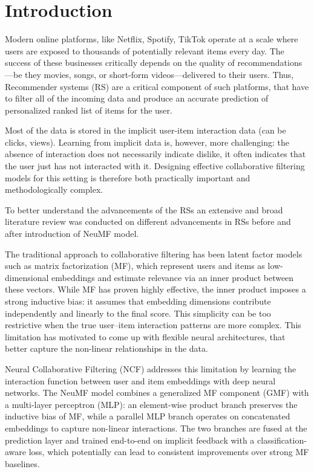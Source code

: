 \documentclass[11pt]{article}
\begin{document}





\section{Introduction}

Modern online platforms, like Netflix, Spotify, TikTok operate at a scale where users are exposed to thousands of potentially relevant items every day. The success of these businesses critically depends on the quality of recommendations—be they movies, songs, or short-form videos—delivered to their users. Thus, Recommender systems (RS) are a critical component of such platforms, that have to filter all of the incoming data and produce an accurate prediction of personalized ranked list of items for the user.

Most of the data is stored in the implicit user-item interaction data (can be clicks, views). Learning from implicit data is, however, more challenging: the absence of interaction does not necessarily indicate dislike, it often indicates that the user just has not interacted with it. Designing effective collaborative filtering models for this setting is therefore both practically important and methodologically complex.

To better understand the advancements of the RSs an extensive and broad literature review was conducted on different advancements in RSs before and after introduction of NeuMF model. 

The traditional approach to collaborative filtering has been latent factor models such as matrix factorization (MF), which represent users and items as low-dimensional embeddings and estimate relevance via an inner product between these vectors. While MF has proven highly effective, the inner product imposes a strong inductive bias: it assumes that embedding dimensions contribute independently and linearly to the final score. This simplicity can be too restrictive when the true user–item interaction patterns are more complex. This limitation has motivated to come up with flexible neural architectures, that better capture the non-linear relationships in the data.

Neural Collaborative Filtering (NCF) addresses this limitation by learning the interaction function between user and item embeddings with deep neural networks. The NeuMF model combines a generalized MF component (GMF) with a multi-layer perceptron (MLP): an element-wise product branch preserves the inductive bias of MF, while a parallel MLP branch operates on concatenated embeddings to capture non-linear interactions. The two branches are fused at the prediction layer and trained end-to-end on implicit feedback with a classification-aware loss, which potentially can lead to consistent improvements over strong MF baselines.
\end{document}
